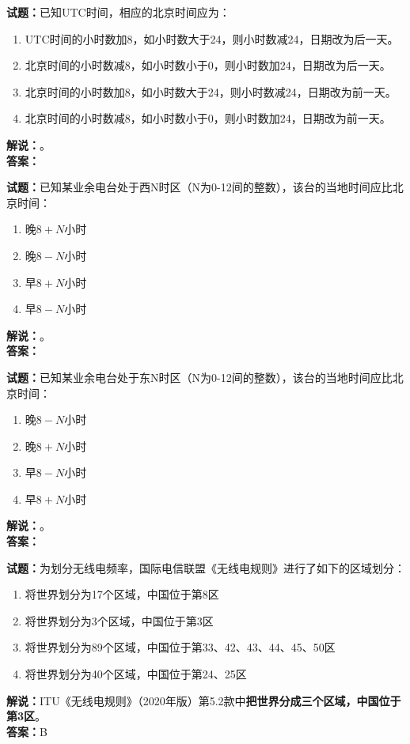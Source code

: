 \documentclass{ctexbook}
\begin{document}
\vspace{\baselineskip}

\noindent\textbf{试题：}已知UTC时间，相应的北京时间应为：
\begin{enumerate}[leftmargin=3em]
  \item UTC时间的小时数加8，如小时数大于24，则小时数减24，日期改为后一天。
  \item 北京时间的小时数减8，如小时数小于0，则小时数加24，日期改为后一天。
  \item 北京时间的小时数加8，如小时数大于24，则小时数减24，日期改为前一天。
  \item 北京时间的小时数减8，如小时数小于0，则小时数加24，日期改为前一天。
\end{enumerate}
\noindent\textbf{解说：}\textbf{}。\\\noindent\textbf{答案：}

\vspace{\baselineskip}

\noindent\textbf{试题：}已知某业余电台处于西N时区（N为0-12间的整数），该台的当地时间应比北京时间：
\begin{enumerate}[leftmargin=3em]
  \item 晚\(8+N\)小时
  \item 晚\(8-N\)小时
  \item 早\(8+N\)小时
  \item 早\(8-N\)小时
\end{enumerate}
\noindent\textbf{解说：}\textbf{}。\\\noindent\textbf{答案：}

\vspace{\baselineskip}

\noindent\textbf{试题：}已知某业余电台处于东N时区（N为0-12间的整数），该台的当地时间应比北京时间：
\begin{enumerate}[leftmargin=3em]
  \item 晚\(8-N\)小时
  \item 晚\(8+N\)小时
  \item 早\(8-N\)小时
  \item 早\(8+N\)小时
\end{enumerate}
\noindent\textbf{解说：}\textbf{}。\\\noindent\textbf{答案：}

\vspace{\baselineskip}

\noindent\textbf{试题：}为划分无线电频率，国际电信联盟《无线电规则》进行了如下的区域划分：
\begin{enumerate}[leftmargin=3em]
  \item 将世界划分为17个区域，中国位于第8区
  \item 将世界划分为3个区域，中国位于第3区
  \item 将世界划分为89个区域，中国位于第33、42、43、44、45、50区
  \item 将世界划分为40个区域，中国位于第24、25区
\end{enumerate}
\noindent\textbf{解说：}ITU《无线电规则》（2020年版）第5.2款中\textbf{把世界分成三个区域，中国位于第3区}。\\\noindent\textbf{答案：}B
\end{document}
